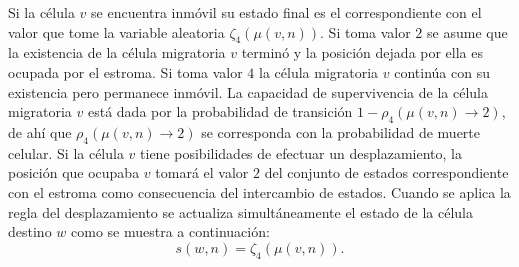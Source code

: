 Si la c\'elula $v$ se encuentra inm\'ovil su estado final es el correspondiente con el valor que tome la variable aleatoria $\zeta_4(\mu(v,n))$. Si toma valor $2$ se asume que la existencia de la c\'elula migratoria $v$ termin\'o y la posici\'on dejada por ella es ocupada por el estroma. Si toma valor $4$ la c\'elula migratoria $v$ contin\'ua con su existencia pero permanece inm\'ovil. La capacidad de supervivencia de la c\'elula migratoria $v$ est\'a dada por la probabilidad de transici\'on $1-\rho_4(\mu(v,n) \rightarrow 2)$, de ah\'i que $\rho_4(\mu(v,n) \rightarrow 2)$ se corresponda con la probabilidad de muerte celular. Si la c\'elula $v$ tiene posibilidades de efectuar un desplazamiento, la posici\'on que ocupaba $v$ tomar\'a el valor $2$ del conjunto de estados correspondiente con el estroma como consecuencia del intercambio de estados. Cuando se aplica la regla del desplazamiento se actualiza simult\'aneamente el estado de la c\'elula destino $w$ como se muestra a continuaci\'on:
\begin{equation}
s(w,n) = \zeta_4(\mu(v,n)). \label{eq-interchange}
\end{equation}

